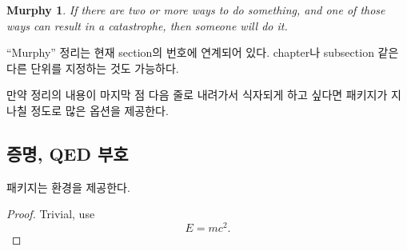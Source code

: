 \begin{example}
\newtheorem{mur}{Murphy}[section]

\begin{mur} If there are two or 
more ways to do something, and 
one of those ways can result in
a catastrophe, then someone 
will do it.\end{mur}
\end{example}


``Murphy'' 정리는 현재 section의 번호에 연계되어 있다. chapter나 subsection 같은 다른 단위를 지정하는 것도 가능하다.

만약 정리의 내용이 마지막 점 다음 줄로 내려가서 식자되게 하고 싶다면  패키지가 지나칠 정도로 많은 옵션을 제공한다.

\subsection{증명, QED 부호}
\label{sec:putting-qed-right}

 패키지는  환경을 제공한다.

\begin{example}
\begin{proof}
 Trivial, use
 \begin{equation*}
   E=mc^2.
 \end{equation*}
\end{proof}
\end{example}

